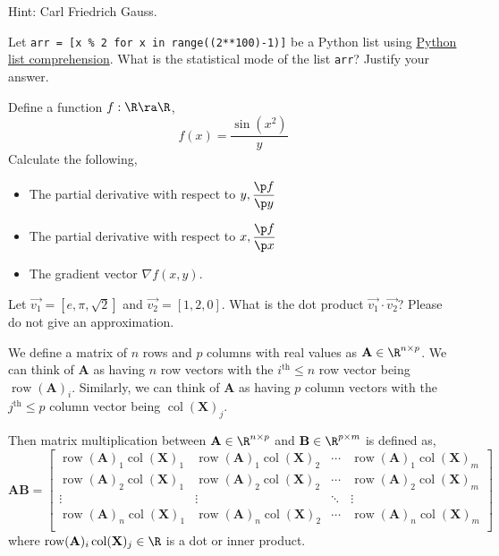 \documentclass{homework}
\DeclareMathOperator{\row}{row}
\DeclareMathOperator{\col}{col}
\newcommand\listcomp{\href{%
    https://www.w3schools.com/python/python_lists_comprehension.asp%
  }{Python list comprehension}}
\begin{document}
Hint: Carl Friedrich Gauss.


\question Let \texttt{arr = [x \% 2 for x in range((2**100)-1)]} be a
Python list using \listcomp{}. What is the statistical mode of the
list \texttt{arr}? Justify your answer.


\question Define a function $f:\R\ra\R$,
\[
  f(x) = \frac{\sin(x^2)}{y}
\]
Calculate the following,
\begin{itemize}
  \item The partial derivative with respect to $y, \displaystyle\frac{\p
            f}{\p y}$
  \item The partial derivative with respect to $x, \displaystyle\frac{\p
            f}{\p x}$
  \item The gradient vector $\nabla f(x, y)$.
\end{itemize}

\question Let $\vec{v_1} = [e, \pi, \sqrt{2}]$ and $\vec{v_2} = [1, 2, 0]$.
What is the dot product $\vec{v_1} \cdot \vec{v_2}$? Please do not
give an approximation.


\question We define a matrix of $n$ rows and $p$ columns with real values as
$\mathbf{A} \in \R^{n\times p}$. We can think of $\mathbf{A}$ as
having $n$ row vectors with the $i^\text{th} \leq n$ row vector
being $\row(\mathbf{A})_i$. Similarly, we can think of
$\mathbf{A}$ as having $p$ column vectors with the $j^\text{th}
  \leq p$ column vector being $\col(\mathbf{X})_j$.

Then matrix multiplication between $\mathbf{A} \in \R^{n\times p}$
and $\mathbf{B} \in \R^{p\times m}$ is defined as,
\[
  \mathbf{AB} =
  \begin{bmatrix}
    \row(\mathbf{A})_1\col(\mathbf{X})_1 & \row(\mathbf{A})_1\col(\mathbf{X})_2 & \cdots & \row(\mathbf{A})_1\col(\mathbf{X})_m \\
    \row(\mathbf{A})_2\col(\mathbf{X})_1 & \row(\mathbf{A})_2\col(\mathbf{X})_2 & \cdots & \row(\mathbf{A})_2\col(\mathbf{X})_m \\
    \vdots                               & \vdots                               & \ddots & \vdots                               \\
    \row(\mathbf{A})_n\col(\mathbf{X})_1 & \row(\mathbf{A})_n\col(\mathbf{X})_2 & \cdots & \row(\mathbf{A})_n\col(\mathbf{X})_m \\
  \end{bmatrix}
\]
where $\row(\mathbf{A})_i\col(\mathbf{X})_j \in \R$ is a dot or
inner product.
\end{document}
